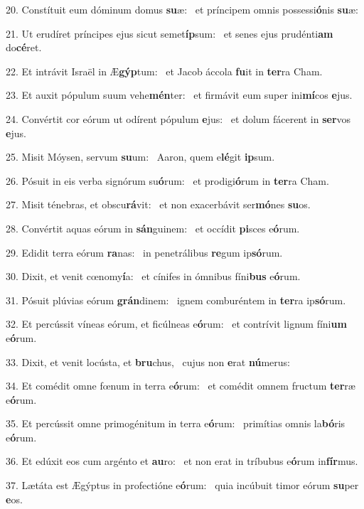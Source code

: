 20. Constítuit eum dóminum domus \textbf{su}æ: \ast\  et príncipem omnis possessi\textbf{ó}nis \textbf{su}æ:\

21. Ut erudíret príncipes ejus sicut semet\textbf{íp}sum: \ast\  et senes ejus prudénti\textbf{am} do\textbf{cé}ret.\

22. Et intrávit Israël in Æ\textbf{gýp}tum: \ast\  et Jacob áccola \textbf{fu}it in \textbf{ter}ra Cham.\

23. Et auxit pópulum suum vehe\textbf{mén}ter: \ast\  et firmávit eum super ini\textbf{mí}cos \textbf{e}jus.\

24. Convértit cor eórum ut odírent pópulum \textbf{e}jus: \ast\  et dolum fácerent in \textbf{ser}vos \textbf{e}jus.\

25. Misit Móysen, servum \textbf{su}um: \ast\  Aaron, quem e\textbf{lé}git \textbf{ip}sum.\

26. Pósuit in eis verba signórum su\textbf{ó}rum: \ast\  et prodigi\textbf{ó}rum in \textbf{ter}ra Cham.\

27. Misit ténebras, et obscu\textbf{rá}vit: \ast\  et non exacerbávit ser\textbf{mó}nes \textbf{su}os.\

28. Convértit aquas eórum in \textbf{sán}guinem: \ast\  et occídit \textbf{pi}sces e\textbf{ó}rum.\

29. Edidit terra eórum \textbf{ra}nas: \ast\  in penetrálibus \textbf{re}gum ip\textbf{só}rum.\

30. Dixit, et venit cœnomy\textbf{í}a: \ast\  et cínifes in ómnibus fíni\textbf{bus} e\textbf{ó}rum.\

31. Pósuit plúvias eórum \textbf{grán}dinem: \ast\  ignem comburéntem in \textbf{ter}ra ip\textbf{só}rum.\

32. Et percússit víneas eórum, et ficúlneas e\textbf{ó}rum: \ast\  et contrívit lignum fíni\textbf{um} e\textbf{ó}rum.\

33. Dixit, et venit locústa, et \textbf{bru}chus, \ast\  cujus non \textbf{e}rat \textbf{nú}merus:\

34. Et comédit omne fœnum in terra e\textbf{ó}rum: \ast\  et comédit omnem fructum \textbf{ter}ræ e\textbf{ó}rum.\

35. Et percússit omne primogénitum in terra e\textbf{ó}rum: \ast\  primítias omnis la\textbf{bó}ris e\textbf{ó}rum.\

36. Et edúxit eos cum argénto et \textbf{au}ro: \ast\  et non erat in tríbubus e\textbf{ó}rum in\textbf{fír}mus.\

37. Lætáta est Ægýptus in profectióne e\textbf{ó}rum: \ast\  quia incúbuit timor eórum \textbf{su}per \textbf{e}os.\

